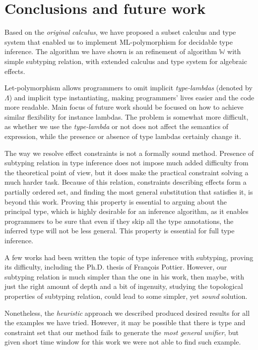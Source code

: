 \documentclass[declaration,shortabstract]{iithesis}
\theoremstyle{definition} \newtheorem{definition}{Definition}[section]
\begin{document}
\chapter{Conclusions and future work}
Based on the \textit{original calculus}, we have proposed a subset calculus and type system
that enabled us to implement ML-polymorphism for decidable type inference.
The algorithm we have shown is an refinement of algorithm $\mathbb{W}$
with simple subtyping relation, with extended calculus and type system for
algebraic effects.

Let-polymorphism allows programmers to omit implicit \textit{type-lambdas}
(denoted by $\Lambda$) and implicit type instantiating, 
making programmers' lives easier and the code more readable.
Main focus of future work should be focused on how to achieve
similar flexibility for instance lambdas.
The problem is somewhat more difficult,
as whether we use the \textit{type-lambda} or not does not affect
the semantics of expression, while the presence or absence
of type lambdas certainly change it.

The way we resolve effect constraints is not a formally sound method.
Presence of subtyping relation in type inference does not impose
much added difficulty from the theoretical point of view,
but it does make the practical constraint solving a much harder task.
Because of this relation, constraints describing effects
form a partially ordered set, and finding the most general
substitution that satisfies it, is beyond this work.
Proving this property is essential to arguing about the
principal type, which is highly desirable for an inference algorithm,
as it enables programmers to be sure that even if they skip all
the type annotations, the inferred type will not be less general.
This  property  is  essential  for full  type  inference.

A few works had been written the topic of type inference with subtyping,
proving its difficulty, including the  Ph.D. thesis of François Pottier\cite{francois}.
However, our subtyping relation is much simpler than the one in his work,
then maybe, with just the right amount of depth and a bit of ingenuity,
studying the topological properties of subtyping relation,
could lead to some simpler, yet \textit{sound} solution.

Nonetheless, the \textit{heuristic} approach we described
produced desired results for all the examples we have tried.
However, it may be possible that there is type and constraint set that our method
fails to generate the \textit{most general unifier}, but given short time window for
this work we were not able to find such example.
\end{document}
